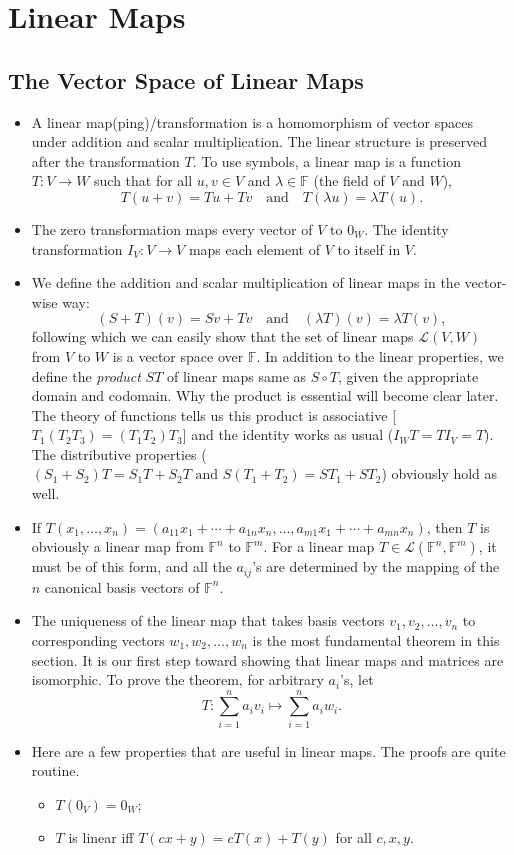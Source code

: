 \documentclass{article}
\newcommand{\F}{\mathbb{F}}
\begin{document}
\section{Linear Maps}
\subsection{The Vector Space of Linear Maps}
\begin{itemize}
    \item A linear map(ping)/transformation is a homomorphism of vector spaces under addition and scalar multiplication. The linear structure is preserved after the transformation $T$. To use symbols, a linear map is a function $T: V \rightarrow W$ such that for all $u,v \in V$ and $\lambda \in \F$ (the field of $V$ and $W$),
    \begin{equation*}
        T(u+v) = Tu + Tv \quad \text{and} \quad
        T (\lambda u) = \lambda T(u).
    \end{equation*}
    \item The zero transformation maps every vector of $V$ to $0_W$. The identity transformation $I_V: V \rightarrow V$ maps each element of $V$ to itself in $V$.
    \item We define the addition and scalar multiplication of linear maps in the vector-wise way: $$(S+T)(v) = Sv + Tv \quad \text{and} \quad (\lambda T)(v) = \lambda T(v),$$ following which we can easily show that the set of linear maps $\mathcal{L}(V,W)$ from $V$ to $W$ is a vector space over $\F$. In addition to the linear properties, we define the \textit{product} $ST$ of linear maps same as $S \circ T$, given the appropriate domain and codomain. Why the product is essential will become clear later. The theory of functions tells us this product is associative [$T_1(T_2 T_3) = (T_1 T_2) T_3$] and the identity works as usual ($I_W T = T I_V = T$). The distributive properties ($(S_1 + S_2) T = S_1 T + S_2 T \text{ and } S(T_1 + T_2) = S T_1 + S T_2$) obviously hold as well.
    \item If $T(x_1,\dots,x_n) = (a_{11}x_1+\cdots+a_{1n}x_n,\dots,a_{m1}x_1+\cdots+a_{mn}x_n)$, then $T$ is obviously a linear map from $\F^n$ to $\F^m$. For a linear map $T \in \mathcal{L}(\F^n,\F^m)$, it must be of this form, and all the $a_{ij}$'s are determined by the mapping of the $n$ canonical basis vectors of $\F^n$.
    \item The uniqueness of the linear map that takes basis vectors $v_1, v_2, \dots, v_n$ to corresponding vectors $w_1, w_2, \dots, w_n$ is the most fundamental theorem in this section. It is our first step toward showing that linear maps and matrices are isomorphic. To prove the theorem, for arbitrary $a_i$'s, let $$T: \sum_{i=1}^n a_i v_i \mapsto \sum_{i=1}^n a_i w_i.$$
    \item Here are a few properties that are useful in linear maps. The proofs are quite routine.
    \begin{itemize}
        \item $T(0_V) = 0_W;$
        \item $T$ is linear iff $T(cx+y) = cT(x) + T(y)$ for all $c,x,y.$
    \end{itemize}
\end{itemize}
\end{document}
